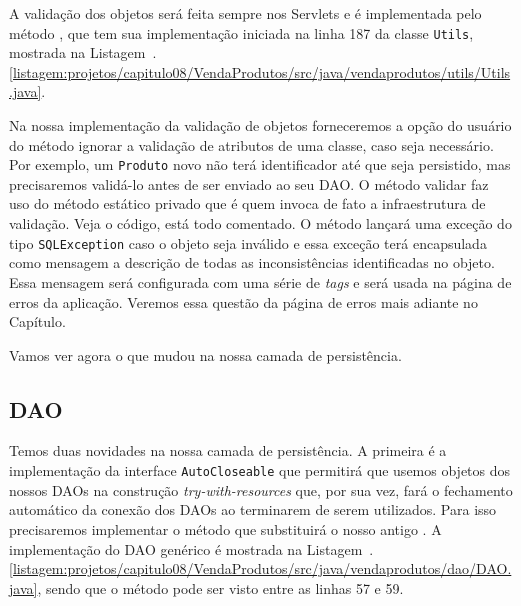 A validação dos objetos será feita sempre nos Servlets e é implementada pelo método , que tem sua implementação iniciada na linha 187 da classe \texttt{Utils}, mostrada na Listagem~\thechapter.\ref{listagem:projetos/capitulo08/VendaProdutos/src/java/vendaprodutos/utils/Utils.java}.


Na nossa implementação da validação de objetos forneceremos a opção do usuário do método ignorar a validação de atributos de uma classe, caso seja necessário. Por exemplo, um \texttt{Produto} novo não terá identificador até que seja persistido, mas precisaremos validá-lo antes de ser enviado ao seu DAO. O método validar faz uso do método estático privado  que é quem invoca de fato a infraestrutura de validação. Veja o código, está todo comentado. O método  lançará uma exceção do tipo \texttt{SQLException} caso o objeto seja inválido e essa exceção terá encapsulada como mensagem a descrição de todas as inconsistências identificadas no objeto. Essa mensagem será configurada com uma série de \textit{tags}  e será usada na página de erros da aplicação. Veremos essa questão da página de erros mais adiante no Capítulo.

Vamos ver agora o que mudou na nossa camada de persistência.


\subsection{DAO}

Temos duas novidades na nossa camada de persistência. A primeira é a implementação da interface \texttt{AutoCloseable} que permitirá que usemos objetos dos nossos DAOs na construção \textit{try-with-resources} que, por sua vez, fará o fechamento automático da conexão dos DAOs ao terminarem de serem utilizados. Para isso precisaremos implementar o método  que substituirá o nosso antigo . A implementação do DAO genérico é mostrada na Listagem~\thechapter.\ref{listagem:projetos/capitulo08/VendaProdutos/src/java/vendaprodutos/dao/DAO.java}, sendo que o método  pode ser visto entre as linhas 57 e 59.

